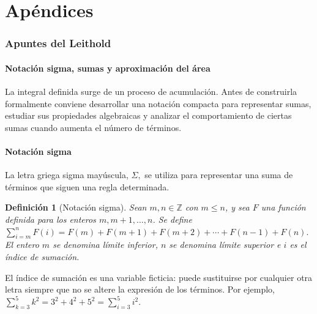 \documentclass[12pt]{article}
\newtheorem{Def}{Definici\'on}
\begin{document}
\renewcommand{\thesection}{A\arabic{section} }
\setlength{\cftsecnumwidth}{3.5em}
\setlength{\cftsubsecnumwidth}{4.5em}
\setlength{\cftsubsubsecnumwidth}{5.5em}
\setcounter{section}{0}



\part{Ap\'endices}
\setcounter{section}{0}
\section{Apuntes del Leithold}

\subsection*{Notación sigma, sumas y aproximación del área}
La integral definida surge de un proceso de acumulación. Antes de construirla formalmente conviene desarrollar una notación compacta para representar sumas, estudiar sus propiedades algebraicas y analizar el comportamiento de ciertas sumas cuando aumenta el número de términos.
\subsection*{Notación sigma}
La letra griega sigma mayúscula,
$
\Sigma,
$
se utiliza para representar una suma de términos que siguen una regla
determinada.

\begin{Def}[Notación sigma]
Sean $m,n\in\mathbb{Z}$ con $m\leq n$, y sea $F$ una función definida para
los enteros $m,m+1,\dots,n$. Se define
$
\sum_{i=m}^{n} F(i)
=
F(m)+F(m+1)+F(m+2)+\cdots+F(n-1)+F(n).
$
El entero $m$ se denomina \emph{límite inferior}, $n$ se denomina
\emph{límite superior} e $i$ es el \emph{índice de sumación}.
\end{Def}

El índice de sumación es una variable ficticia: puede sustituirse por cualquier
otra letra siempre que no se altere la expresión de los términos. Por ejemplo,
$
\sum_{k=3}^{5} k^2
=
3^2+4^2+5^2
=
\sum_{i=3}^{5} i^2.
$
\end{document}
